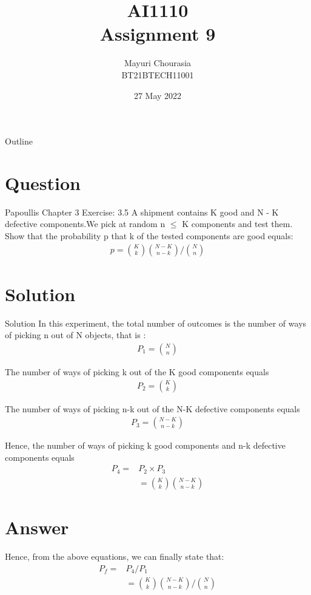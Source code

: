 \documentclass{beamer}
\title{AI1110 \\ Assignment 9}
\author{Mayuri Chourasia\\BT21BTECH11001}
\date{27 May 2022}
\begin{document}
	\begin{frame}
	\titlepage
	\end{frame}
	\begin{frame}{Outline}
    		\tableofcontents
	\end{frame}
	
    \section{Question}
	\begin{frame}{Papoullis Chapter 3 Exercise: 3.5}
	A shipment contains K good and N - K defective components.We pick at random n $\leq$ K components and test them. Show that the probability p that k of the tested components are good equals:
	\begin{align}
	    p=\binom{K}{k}\binom{N-K}{n-k} \Big/ \binom{N}{n}
	\end{align}
	\end{frame}
	
\section{Solution}
	\begin{frame}{Solution}
In this experiment, the total number of outcomes is the number of ways of picking n out of N objects, that is :
\begin{align}
    P_1=\binom{N}{n}
\end{align}
\end{frame}
\begin{frame}
The number of ways of picking k out of the K good components equals
\begin{align}
    P_2=\binom{K}{k}
\end{align}
\end{frame}
\begin{frame}
The number of ways of picking n-k out of the N-K defective components equals 
\begin{align}
    P_3=\binom{N-K}{n-k}
\end{align}
\end{frame}
\begin{frame}
Hence, the number of ways of picking k good components and n-k defective components equals
\begin{align}
    P_4=&P_2\times P_3\\
    &=\binom{K}{k}\binom{N-K}{n-k}
\end{align}
	\end{frame}

\section{Answer}
	\begin{frame}
	Hence, from the above equations, we can finally state that:
	\begin{align}
	    P_f=&P_4/P_1\\
	    &=\binom{K}{k}\binom{N-K}{n-k} \Big/ \binom{N}{n}
	\end{align}
	\end{frame}
	
\end{document}
